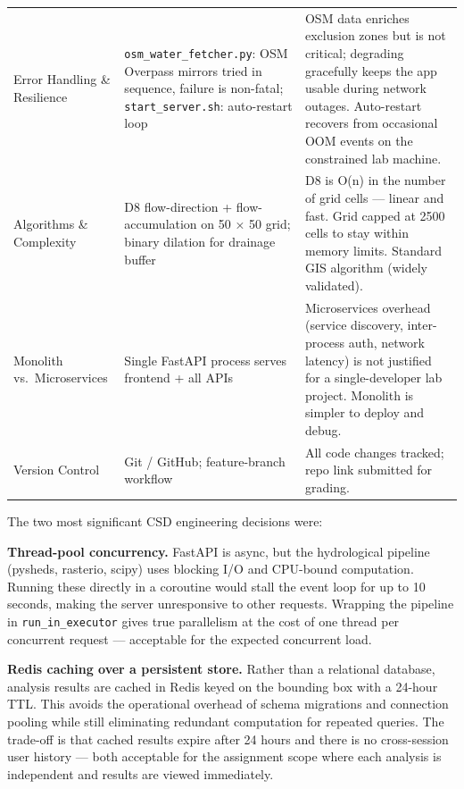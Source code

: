 \documentclass[manuscript,screen,review]{acmart}
\begin{document}
\begin{table}[t]
\begin{tabular}{p{2.8cm}p{5.0cm}p{6.5cm}}
    Error Handling \& Resilience &
      \texttt{osm\_water\_fetcher.py}: OSM Overpass mirrors tried
      in sequence, failure is non-fatal; \texttt{start\_server.sh}:
      auto-restart loop &
      OSM data enriches exclusion zones but is not critical;
      degrading gracefully keeps the app usable during network
      outages. Auto-restart recovers from occasional OOM events
      on the constrained lab machine. \\
    Algorithms \& Complexity &
      D8 flow-direction + flow-accumulation on 50 × 50 grid;
      binary dilation for drainage buffer &
      D8 is O(n) in the number of grid cells --- linear and fast.
      Grid capped at 2500 cells to stay within memory limits.
      Standard GIS algorithm (widely validated). \\
    Monolith vs.\ Microservices &
      Single FastAPI process serves frontend + all APIs &
      Microservices overhead (service discovery, inter-process
      auth, network latency) is not justified for a single-developer
      lab project. Monolith is simpler to deploy and debug. \\
    Version Control &
      Git / GitHub; feature-branch workflow &
      All code changes tracked; repo link submitted for grading. \\
    \bottomrule
  \end{tabular}
\end{table}

The two most significant CSD engineering decisions were:

\textbf{Thread-pool concurrency.} FastAPI is async, but the
hydrological pipeline (pysheds, rasterio, scipy) uses blocking I/O
and CPU-bound computation. Running these directly in a coroutine
would stall the event loop for up to 10 seconds, making the server
unresponsive to other requests. Wrapping the pipeline in
\texttt{run\_in\_executor} gives true parallelism at the cost of
one thread per concurrent request --- acceptable for the expected
concurrent load.

\textbf{Redis caching over a persistent store.} Rather than a
relational database, analysis results are cached in Redis keyed on
the bounding box with a 24-hour TTL. This avoids the operational
overhead of schema migrations and connection pooling while still
eliminating redundant computation for repeated queries. The trade-off
is that cached results expire after 24 hours and there is no
cross-session user history --- both acceptable for the assignment
scope where each analysis is independent and results are viewed
immediately.
\end{document}
